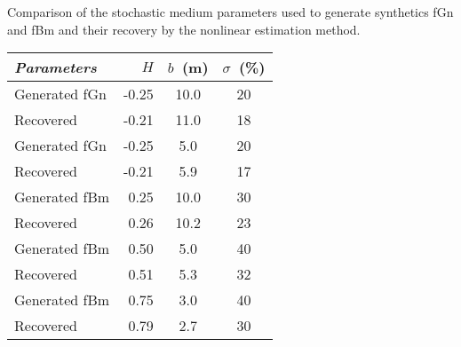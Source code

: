 {Comparison of the stochastic medium parameters
used to generate synthetics fGn and fBm and their 
recovery by the nonlinear estimation method.}
{
\begin{center}
    \begin{tabular}{|l|rcc|}
      \hline
      {\it Parameters} & $H$ & $b$~(m) & $\sigma$~(\%) \\[0.2mm]
      \hline
     {Generated fGn} & -0.25 & 10.0 & 20 \\[-0.4mm]
     {Recovered}     & -0.21 & 11.0 & 18 \\[0.2mm]
      \hline
     {Generated fGn} & -0.25 &  5.0 & 20 \\[-0.4mm]
     {Recovered}     & -0.21 &  5.9 & 17 \\[0.2mm]
      \hline
     {Generated fBm} &  0.25 &  10.0 & 30 \\[-0.4mm]
     {Recovered}     &  0.26 &  10.2 & 23 \\[0.2mm]
      \hline
     {Generated fBm} &  0.50 & 5.0 & 40 \\[-0.4mm]
     {Recovered}     &  0.51 & 5.3 & 32 \\[0.2mm]
      \hline
     {Generated fBm} & 0.75 & 3.0 & 40 \\[-0.4mm]
     {Recovered}     & 0.79 & 2.7 & 30 \\[0.2mm]
      \hline
    \end{tabular}
\end{center}
}

